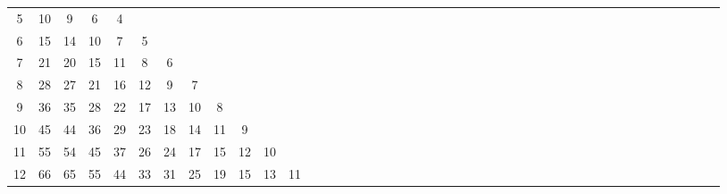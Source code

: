 \documentclass[12pt,a4paper]{amsart}
\theoremstyle{definition} %
\theoremstyle{plain} %
\begin{document}
\begin{table}[h]
{\begin{tabular}{|c|*{44}{c|}}
            5 &  10 &   9 &   6 &   4 &     &     &     &     &     &      &      &      &      &      &      &      &      &      &      &      &      &      &      &      &      &      &      &      &      &      &      &      &      &      &      &      &      &      &      &      &      &      &      &      \\
            6 &  15 &  14 &  10 &   7 &   5 &     &     &     &     &      &      &      &      &      &      &      &      &      &      &      &      &      &      &      &      &      &      &      &      &      &      &      &      &      &      &      &      &      &      &      &      &      &      &      \\
            7 &  21 &  20 &  15 &  11 &   8 &   6 &     &     &     &      &      &      &      &      &      &      &      &      &      &      &      &      &      &      &      &      &      &      &      &      &      &      &      &      &      &      &      &      &      &      &      &      &      &      \\
            8 &  28 &  27 &  21 &  16 &  12 &   9 &   7 &     &     &      &      &      &      &      &      &      &      &      &      &      &      &      &      &      &      &      &      &      &      &      &      &      &      &      &      &      &      &      &      &      &      &      &      &      \\
            9 &  36 &  35 &  28 &  22 &  17 &  13 &  10 &   8 &     &      &      &      &      &      &      &      &      &      &      &      &      &      &      &      &      &      &      &      &      &      &      &      &      &      &      &      &      &      &      &      &      &      &      &      \\
            10 &  45 &  44 &  36 &  29 &  23 &  18 &  14 &  11 &   9 &      &      &      &      &      &      &      &      &      &      &      &      &      &      &      &      &      &      &      &      &      &      &      &      &      &      &      &      &      &      &      &      &      &      &      \\
            11 &  55 &  54 &  45 &  37 &  26 &  24 &  17 &  15 &  12 &   10 &      &      &      &      &      &      &      &      &      &      &      &      &      &      &      &      &      &      &      &      &      &      &      &      &      &      &      &      &      &      &      &      &      &      \\
            12 &  66 &  65 &  55 &  44 &  33 &  31 &  25 &  19 &  15 &   13 &   11 &      &      &      &      &      &      &      &      &      &      &      &      &      &      &      &      &      &      &      &      &      &      &      &      &      &      &      &      &      &      &      &      &      \\

\end{tabular}}
\end{table}
\end{document}
